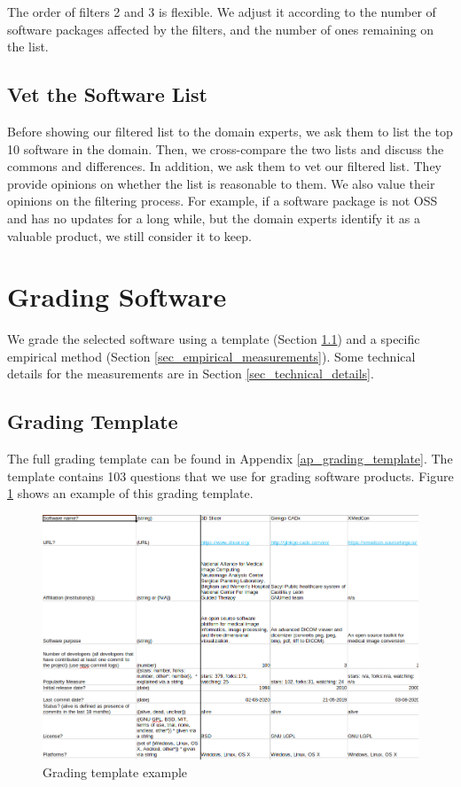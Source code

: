 The order of filters 2 and 3 is flexible. We adjust it according to the number of software packages affected by the filters, and the number of ones remaining on the list.

\subsection{Vet the Software List}
\label{sec_vet_software_list}
Before showing our filtered list to the domain experts, we ask them to list the top 10 software in the domain. Then, we cross-compare the two lists and discuss the commons and differences.  In addition, we ask them to vet our filtered list. They provide opinions on whether the list is reasonable to them. We also value their opinions on the filtering process. For example, if a software package is not OSS and has no updates for a long while, but the domain experts identify it as a valuable product, we still consider it to keep.

\section{Grading Software}
\label{sec_grading_software}

We grade the selected software using a template (Section \ref{sec_grading_template}) and a specific empirical method (Section \ref{sec_empirical_measurements}). Some technical details for the measurements are in Section \ref{sec_technical_details}.

\subsection{Grading Template}
\label{sec_grading_template}
The full grading template can be found in Appendix \ref{ap_grading_template}. The template contains 103 questions that we use for grading software products. Figure \ref{fg_grading_template_example} shows an example of this grading template.

\begin{figure}[h]
\includegraphics[scale=0.42]{figures/template.png}
\caption{Grading template example}
\label{fg_grading_template_example}
\end{figure}


